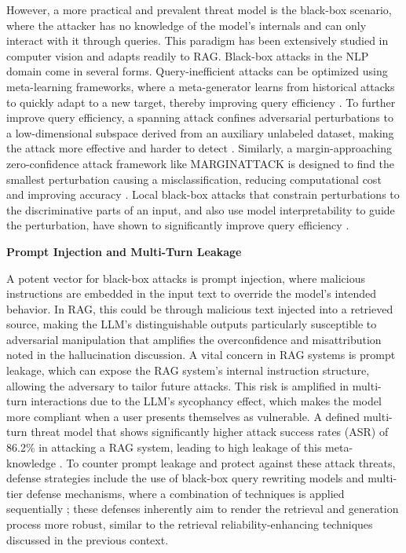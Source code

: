 \documentclass[11pt]{article}
\begin{document}
However, a more practical and prevalent threat model is the black-box scenario, where the attacker has no knowledge of the model's internals and can only interact with it through queries. This paradigm has been extensively studied in computer vision \cite{ref153,ref154} and adapts readily to RAG. Black-box attacks in the NLP domain come in several forms. Query-inefficient attacks can be optimized using meta-learning frameworks, where a meta-generator learns from historical attacks to quickly adapt to a new target, thereby improving query efficiency \cite{ref155}. To further improve query efficiency, a spanning attack confines adversarial perturbations to a low-dimensional subspace derived from an auxiliary unlabeled dataset, making the attack more effective and harder to detect \cite{ref156}. Similarly, a margin-approaching zero-confidence attack framework like MARGINATTACK is designed to find the smallest perturbation causing a misclassification, reducing computational cost and improving accuracy \cite{ref157}. Local black-box attacks that constrain perturbations to the discriminative parts of an input, and also use model interpretability to guide the perturbation, have shown to significantly improve query efficiency \cite{ref158}.

\textbf{Prompt Injection and Multi-Turn Leakage}

A potent vector for black-box attacks is prompt injection, where malicious instructions are embedded in the input text to override the model's intended behavior. In RAG, this could be through malicious text injected into a retrieved source, making the LLM's distinguishable outputs particularly susceptible to adversarial manipulation that amplifies the overconfidence and misattribution noted in the hallucination discussion. A vital concern in RAG systems is prompt leakage, which can expose the RAG system's internal instruction structure, allowing the adversary to tailor future attacks. This risk is amplified in multi-turn interactions due to the LLM's sycophancy effect, which makes the model more compliant when a user presents themselves as vulnerable. A defined multi-turn threat model that shows significantly higher attack success rates (ASR) of 86.2\% in attacking a RAG system, leading to high leakage of this meta-knowledge \cite{ref159}. To counter prompt leakage and protect against these attack threats, defense strategies include the use of black-box query rewriting models and multi-tier defense mechanisms, where a combination of techniques is applied sequentially \cite{ref159}; these defenses inherently aim to render the retrieval and generation process more robust, similar to the retrieval reliability-enhancing techniques discussed in the previous context.
\end{document}
